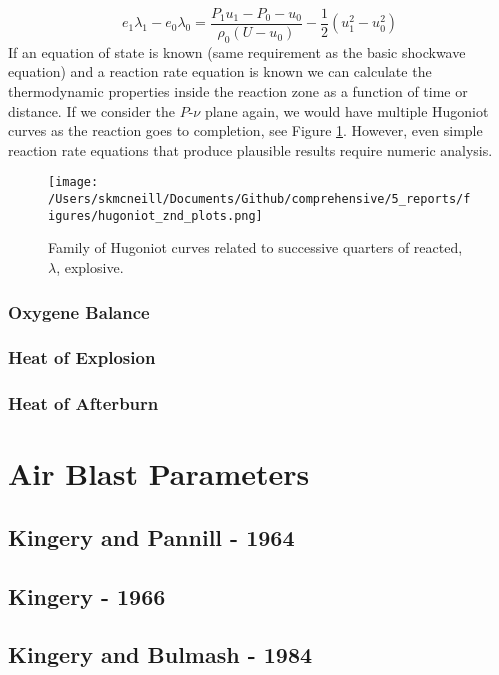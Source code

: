 \begin{equation}\label{eq:conservation_of_energy_reactive}
e_1 \lambda_1-e_0 \lambda_0=\frac{P_1u_1-P_0-u_0}{\rho_0(U-u_0)}-\frac{1}{2}(u_1^2-u_0^2)
\end{equation}
If an equation of state is known (same requirement as the basic shockwave equation) and a reaction rate equation is known we can calculate the thermodynamic properties inside the reaction zone as a function of time or distance.  If we consider the $P\mbox{-}\nu$ plane again, we would have multiple Hugoniot curves as the reaction goes to completion, see Figure \ref{fig:zdn_reaction_zone}. However, even simple reaction rate equations that produce plausible results require numeric analysis.
 \begin{figure}
  \begin{center}
   \texttt{[image: /Users/skmcneill/Documents/Github/comprehensive/5\_reports/figures/hugoniot\_znd\_plots.png]}
  \end{center}
  \caption{Family of Hugoniot curves related to successive quarters of reacted, $\lambda$, explosive.}
\label{fig:zdn_reaction_zone}
\end{figure}%

\subsubsection{Oxygene Balance}
\lipsum[10]
\subsubsection{Heat of Explosion}
\lipsum[10]
\subsubsection{Heat of Afterburn}
\lipsum[10]

\section{Air Blast Parameters}
\lipsum[10]
\subsection{Kingery and Pannill - 1964}
\lipsum[10]
\subsection{Kingery - 1966}
\lipsum[10]
\subsection{Kingery and Bulmash - 1984}
\lipsum[10]
